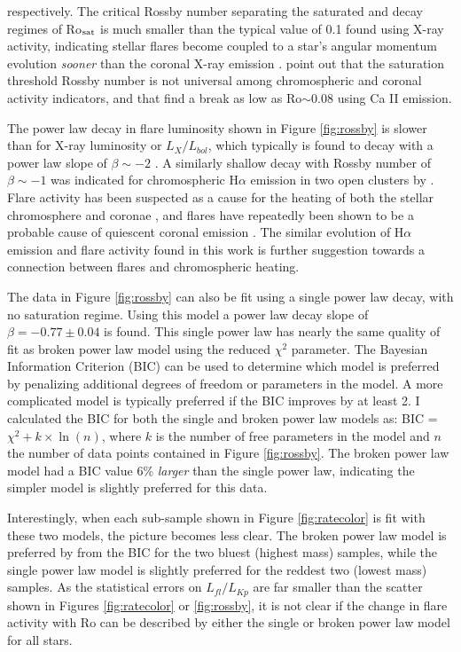 \documentclass[twocolumn]{aastex6}
\begin{document}
\noindent
respectively. The critical Rossby number separating the saturated and decay regimes of Ro$_{\rm sat}$ is much smaller than the typical value of 0.1 found using X-ray activity, indicating stellar flares become coupled to a star's angular momentum evolution {\it sooner} than the coronal X-ray emission \citep{pizzolato2003}. \citet{wright2011} point out that the saturation threshold Rossby number is not universal among chromospheric and coronal activity indicators, and that \citet{marsden2009} find a break as low as Ro$\sim$0.08 using Ca II emission.

The power law decay in flare luminosity shown in Figure \ref{fig:rossby} is slower than for X-ray luminosity or $L_{X}/L_{bol}$, which typically is found to decay with a power law slope of $\beta \sim-2$ \citet{wright2011}. A similarly shallow decay with Rossby number of  $\beta \sim-1$ was indicated for chromospheric H$\alpha$ emission in two open clusters by \citet{douglas2014}. Flare activity has been suspected as a cause for the heating of both the stellar chromosphere and coronae \citep{skumanich1985}, and flares have repeatedly been shown to be a probable cause of quiescent coronal emission \citep[e.g.][]{kashyap2002}. The similar evolution of H$\alpha$ emission and flare activity found in this work is further suggestion towards a connection between flares and chromospheric heating.


The data in Figure \ref{fig:rossby} can also be fit using a single power law decay, with no saturation regime. Using this model a power law decay slope of $\beta = -0.77 \pm 0.04$ is found. This single power law has nearly the same quality of fit as broken power law model using the reduced $\chi^2$ parameter. The Bayesian Information Criterion (BIC) can be used to determine which model is preferred by penalizing additional degrees of freedom or parameters in the model. A more complicated model is typically preferred if the BIC improves by at least 2. I calculated the BIC for both the single and broken power law models as: BIC = $\chi^2 + k \times \ln(n)$, where $k$ is the number of free parameters in the model and $n$ the number of data points contained in Figure \ref{fig:rossby}. The broken power law model had a BIC value 6\% {\it larger} than the single power law, indicating the simpler model is slightly preferred for this data.  

Interestingly, when each sub-sample shown in Figure \ref{fig:ratecolor} is fit with these two models, the picture becomes less clear. The broken power law model is preferred by from the BIC for the two bluest (highest mass) samples, while the single power law model is slightly preferred for the reddest two (lowest mass) samples. As the statistical errors on $L_{fl}/L_{Kp}$ are far smaller than the scatter shown in Figures \ref{fig:ratecolor} or \ref{fig:rossby}, it is not clear if the change in flare activity with Ro can be described by either the single or broken power law model for all stars. 
\end{document}
